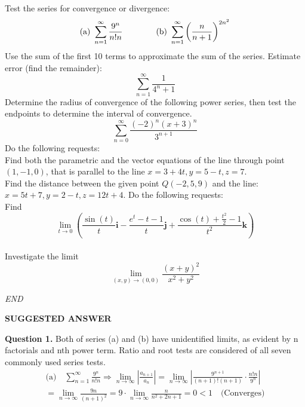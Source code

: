 \documentclass[a4paper]{exam}
\newcommand{\myquad}[1][1]{\hspace*{#1em}\ignorespaces}
\begin{document}
	\vspace*{1mm}
	\begin{questions}
		\question Test the series for convergence or divergence:
		\begin{equation*}
			\text{(a) } \sum_{n = 1}^{\infty} \frac{9^{n}}{n!n}
			\myquad[4] 
			\text{(b) } \sum_{n = 1}^{\infty} \left(\frac{n}{n + 1}\right)^{2n^{2}}
		\end{equation*}
		\question Use the sum of the first 10 terms to approximate the sum of the series. Estimate error (find the remainder):
		\begin{equation*}
			\sum_{n = 1}^{\infty} \frac{1}{4^{n} + 1}
		\end{equation*}
		\question Determine the radius of convergence of the following power series, then test the endpoints to determine the interval of convergence.
		\begin{equation*}
			\sum_{n = 0}^{\infty} \frac{(-2)^{n}(x + 3)^{n}}{3^{n + 1}}
		\end{equation*}
		\question Do the following requests:\\[1ex]
		\noindent {} Find both the parametric and the vector equations of the line through point $(1, -1, 0)$, that is parallel to the line $x = 3 + 4t, y = 5 - t, z = 7$. \\[1ex]
		\noindent {} Find the distance between the given point $Q(-2, 5, 9)$ and the line: $x = 5t + 7, y = 2 - t, z = 12t + 4$.
		\question Do the following requests:\\[1ex]
		\noindent {} Find
		$$ \lim_{t \to 0} \left(\frac{\sin(t)}{t}\mathbf{i} - \frac{e^{t} - t - 1}{t}\mathbf{j} + \frac{\cos(t) + \frac{t^{2}}{2} - 1}{t^{2}} \mathbf{k} \right) $$ \\[1ex]
		\noindent {} Investigate the limit
		$$ \lim_{(x, y) \to (0, 0)} \frac{(x + y)^{2}}{x^{2} + y^{2}} $$
	\end{questions}
	\vspace*{2mm}
	\begin{center}
		\textit{\large{END}}
	\end{center}
	
	\newpage
	
	\begin{center}
		\textbf{SUGGESTED ANSWER}
	\end{center}
	
	\noindent \textbf{Question 1.} Both of series (a) and (b) have unidentified limits, as evident by n factorials and nth power term. Ratio and root tests are considered of all seven commonly used series tests.
	\begin{multline*}
		\text{(a)} \quad \sum_{n = 1}^{\infty} \frac{9^{n}}{n!n} \Longrightarrow 
		\lim_{n \to \infty} \left| \frac{a_{n + 1}}{a_{n}} \right| 
		= \lim_{n \to \infty} \left| \frac{9^{n + 1}}{(n+1)! (n + 1)} 
		\cdot \frac{n! n}{9^{n}} \right| \\
		= \lim_{n \to \infty} \frac{9n}{(n + 1)^2} 
		= 9 \cdot \lim_{n \to \infty} \frac{n}{n^2 + 2n + 1} 
		= 0 < 1 \quad \text{(Converges)}
	\end{multline*}
	
\end{document}
